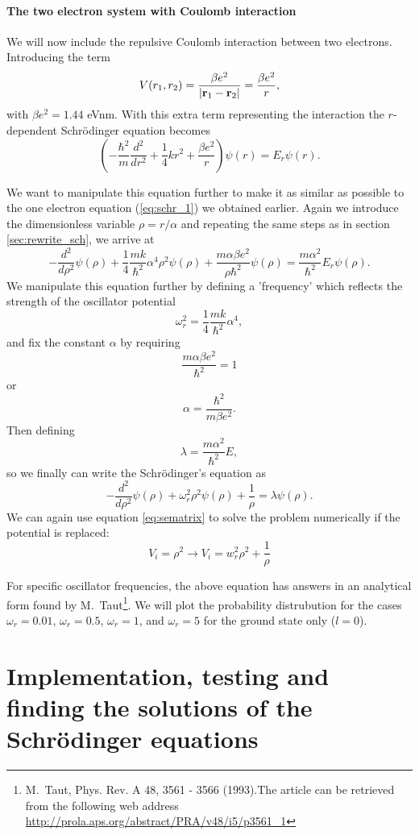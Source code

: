 \documentclass[11pt,a4wide]{article}
\begin{document}
\subsection{The two electron system with Coulomb interaction}
We will now include the repulsive Coulomb interaction between two electrons. Introducing the term
\[
V(r_1,r_2) = \frac{\beta e^2}{|{\bf r}_1-{\bf r}_2|}=\frac{\beta e^2}{r},
\]
with $\beta e^2=1.44$ eVnm. With this extra term representing the interaction the $r$-dependent Schr\"odinger equation becomes
\[
\left(  -\frac{\hbar^2}{m} \frac{d^2}{dr^2}+ \frac{1}{4}k r^2+\frac{\beta e^2}{r}\right)\psi(r)  = E_r \psi(r).
\]

We want to manipulate this equation further to make it as similar as possible to the one electron equation (\ref{eq:schr_1}) we obtained earlier. Again we introduce the dimensionless variable $\rho = r/\alpha$ and repeating the same steps as in section \ref{sec:rewrite_sch}, we arrive at 
\[
  -\frac{d^2}{d\rho^2} \psi(\rho) 
       + \frac{1}{4}\frac{mk}{\hbar^2} \alpha^4\rho^2\psi(\rho)+\frac{m\alpha \beta e^2}{\rho\hbar^2}\psi(\rho)  = 
\frac{m\alpha^2}{\hbar^2}E_r \psi(\rho) .
\]
We manipulate this equation further by defining a 'frequency' which reflects the strength of the oscillator potential
\[
\omega_r^2=\frac{1}{4}\frac{mk}{\hbar^2} \alpha^4,
\]
and fix the constant $\alpha$ by requiring 
\[
\frac{m\alpha \beta e^2}{\hbar^2}=1
\]
or 
\[
\alpha = \frac{\hbar^2}{m\beta e^2}.
\]
Then defining 
\[
\lambda = \frac{m\alpha^2}{\hbar^2}E,
\]
so we finally can write the Schr\"odinger's equation as
\begin{equation}
  -\frac{d^2}{d\rho^2} \psi(\rho) + \omega_r^2\rho^2\psi(\rho) +\frac{1}{\rho} = \lambda \psi(\rho).
  \label{eq: sch_2e_wCol}
\end{equation}
We can again use equation \ref{eq:sematrix} to solve the problem numerically if the potential is replaced:
\[
V_i = \rho^2 \rightarrow V_i = w_r^2\rho^2 + \frac{1}{\rho}
\]

For specific oscillator frequencies, the above equation has answers in an analytical form found by M.~Taut\footnote{M.~Taut, Phys. Rev. A 48, 3561 - 3566 (1993).The article can be retrieved from the following web address \url{http://prola.aps.org/abstract/PRA/v48/i5/p3561_1}}. We will plot the probability distrubution for the cases $\omega_r = 0.01$, $\omega_r = 0.5$, $\omega_r =1$, and $\omega_r = 5$ for the ground state only ($l=0$).




\newpage
\part{Implementation, testing and finding the solutions of the Schr\"odinger equations}
\end{document}
